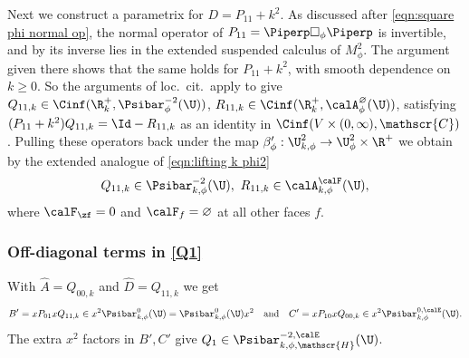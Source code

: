 Next we construct a parametrix for $D=P_{11}+k^2$.
As discussed after \eqref{eqn:square phi normal op}, the normal operator of $P_{11}=\Piperp\square_\phi\Piperp$ is invertible, and by \cite[Prop.\,2.3]{grieser-para} its inverse lies in the extended suspended calculus of $M^2_\phi$. The argument given there shows that the same holds for $P_{11}+k^2$, with smooth dependence on $k\geq0$. So the arguments of loc.\ cit.\ apply to give $Q_{11,k} \in\Cinf(\R_{k}^+,\Psibar^{-2}_\phi(\U))$, $R_{11,k}\in\Cinf(\R_{k}^+,\calA^{\varnothing}_\phi(\U))$, satisfying $(P_{11}+k^2)Q_{11,k}=\Id - R_{11,k}$ as an identity in $\Cinf(V\times(0,\infty),\mathscr{C})$.
Pulling these operators back under the map $\beta'_{\phi} : \U^{2}_{k,\phi} \to \U^{2}_{\phi}\times \R^+$ we obtain by the extended analogue of \eqref{eqn:lifting k phi2}
\[
Q_{11,k}\in \Psibar^{-2}_{k,\phi}(\U),\ R_{11,k} \in \calA^{\calF}_{k,\phi}(\U),
\]
where $\calF_\zf=0$ and $\calF_f=\varnothing$ at all other faces $f$.

\subsubsection*{Off-diagonal terms in \eqref{Q1}}
With $\widehat{A}=Q_{00,k}$ and $\widehat{D}=Q_{11,k}$ we get
\[
B'=xP_{01}x Q_{11,k}\in x^2\Psibar^{0}_{k,\phi}(\U)=\Psibar^{0}_{k,\phi}(\U) x^2\quad\text{and}\quad C'=xP_{10}x Q_{00,k} \in x^2\Psibar_{k,\phi}^{0,\calE}(\U).
\]
The extra $x^2$ factors in $B',C'$ give $Q_1\in \Psibar_{k,\phi,\mathscr{H}}^{-2,\calE}(\U)$.

